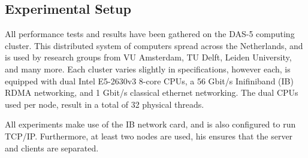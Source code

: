 \subsection{Experimental Setup}\label{subsec:experimental-setup}
All performance tests and results have been gathered on the DAS-5 computing cluster\cite{das5}.
This distributed system of computers spread across the Netherlands, and is used by research groups from VU Amsterdam, TU Delft, Leiden University, and many more.
Each cluster varies slightly in specifications, however each, is equipped with dual Intel E5-2630v3 8-core CPUs, a 56 Gbit/s Inifiniband (IB) RDMA networking, and 1 Gbit/s classical ethernet networking.
The dual CPUs used per node, result in a total of 32 physical threads.

All experiments make use of the IB network card, and is also configured to run TCP/IP.
Furthermore, at least two nodes are used, his ensures that the server and clients are separated.




